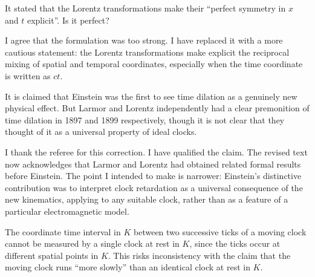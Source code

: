 \documentclass[submitted,11pt]{article}
\begin{document}
\begin{reply}
%
\end{reply}

\begin{point}
It stated that the Lorentz transformations make their ``perfect symmetry in $x$ and $t$ explicit''. Is it perfect?
\end{point}

\begin{reply}
I agree that the formulation was too strong. I have replaced it with a more cautious statement: the Lorentz transformations make explicit the reciprocal mixing of spatial and temporal coordinates, especially when the time coordinate is written as $ct$.
\end{reply}

\begin{point}
It is claimed that Einstein was the first to see time dilation as a genuinely new physical effect. But Larmor and Lorentz independently had a clear premonition of time dilation in 1897 and 1899 respectively, though it is not clear that they thought of it as a universal property of ideal clocks.
\end{point}

\begin{reply}
I thank the referee for this correction. I have qualified the claim. The revised text now acknowledges that Larmor and Lorentz had obtained related formal results before Einstein. The point I intended to make is narrower: Einstein’s distinctive contribution was to interpret clock retardation as a universal consequence of the new kinematics, applying to any suitable clock, rather than as a feature of a particular electromagnetic model.
\end{reply}

\begin{point}
The coordinate time interval in $K$ between two successive ticks of a moving clock cannot be measured by a single clock at rest in $K$, since the ticks occur at different spatial points in $K$. This risks inconsistency with the claim that the moving clock runs ``more slowly'' than an identical clock at rest in $K$.
\end{point}
\end{document}
